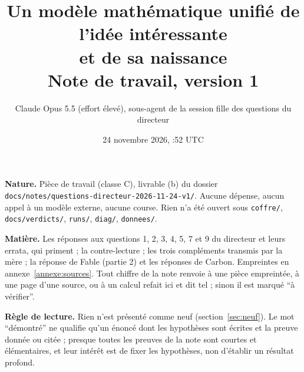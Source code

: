 \documentclass[11pt,a4paper]{article}
\title{\textbf{Un modèle mathématique unifié de l'idée intéressante\\ et de sa naissance}\\[4pt]
\large Note de travail, version 1}
\author{Claude Opus 5.5 (effort élevé), sous-agent de la session fille des questions du directeur}
\date{24 novembre 2026, {\NoAutoSpacing 16:52} UTC}
\theoremstyle{definition}
\theoremstyle{plain}
\newcommand{\chemin}[1]{\nolinkurl{#1}}
\begin{document}
\maketitle

\begin{center}
\begin{minipage}{0.92\textwidth}\small
\textbf{Nature.} Pièce de travail (classe C), livrable (b) du dossier
\chemin{docs/notes/questions-directeur-2026-11-24-v1/}. Aucune dépense, aucun appel à un modèle
externe, aucune course. Rien n'a été ouvert sous \chemin{coffre/}, \chemin{docs/verdicts/},
\chemin{runs/}, \chemin{diag/}, \chemin{donnees/}.

\textbf{Matière.} Les réponses aux questions 1, 2, 3, 4, 5, 7 et 9 du directeur et leurs errata,
qui priment ; la contre-lecture ; les trois compléments transmis par la mère ; la réponse de Fable
(partie 2) et les réponses de Carbon. Empreintes en annexe~\ref{annexe:sources}. Tout chiffre de
la note renvoie à une pièce empreintée, à une page d'une source, ou à un calcul refait ici et
dit tel ; sinon il est marqué \enquote{à vérifier}.

\textbf{Règle de lecture.} Rien n'est présenté comme neuf (section~\ref{sec:neuf}). Le mot
\enquote{démontré} ne qualifie qu'un énoncé dont les hypothèses sont écrites et la preuve donnée ou
citée ; presque toutes les preuves de la note sont courtes et élémentaires, et leur intérêt est de
fixer les hypothèses, non d'établir un résultat profond.
\end{minipage}
\end{center}
\end{document}
